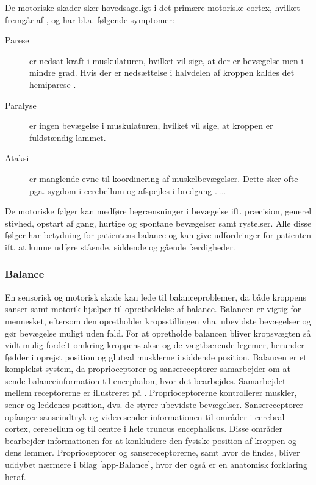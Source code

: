 
De motoriske skader sker hovedsageligt i det primære motoriske cortex, hvilket fremgår af , og har bl.a. følgende symptomer:
\begin{description}
  \item[Parese] er nedsat kraft i muskulaturen, hvilket vil sige, at der er bevægelse men i mindre grad. Hvis der er nedsættelse i halvdelen af kroppen kaldes det hemiparese \cite{Sundhed.dk2014a}.
  \item[Paralyse] er ingen bevægelse i muskulaturen, hvilket vil sige, at kroppen er fuldstændig lammet. \cite{Vistrup2015}
  \item[Ataksi] er manglende evne til koordinering af muskelbevægelser. Dette sker ofte pga. sygdom i cerebellum og afspejles i bredgang \cite{Redaktionen2015a}. 
  \ldots
\end{description}
De motoriske følger kan medføre begrænsninger i bevægelse ift. præcision, generel stivhed, opstart af gang, hurtige og spontane bevægelser samt rystelser. Alle disse følger har betydning for patientens balance og kan give udfordringer for patienten ift. at kunne udføre stående, siddende og gående færdigheder. \cite{Sundhed.dk,DSfA2009} 

\subsubsection{Balance}
En sensorisk og motorisk skade kan lede til balanceproblemer, da både kroppens sanser samt motorik hjælper til opretholdelse af balance. Balancen er vigtig for mennesket, eftersom den opretholder kropsstillingen vha. ubevidste bevægelser og gør bevægelse muligt uden fald. For at opretholde balancen bliver kropsvægten så vidt mulig fordelt omkring kroppens akse og de vægtbærende legemer, herunder fødder i oprejst position og gluteal musklerne i siddende position. \cite{Nichols1997}
Balancen er et komplekst system, da proprioceptorer og sansereceptorer samarbejder om at sende balanceinformation til encephalon, hvor det bearbejdes. Samarbejdet mellem receptorerne er illustreret på . Proprioceptorerne kontrollerer muskler, sener og leddenes position, dvs. de styrer ubevidste bevægelser. \cite{Martini2012} Sansereceptorer opfanger sanseindtryk og videresender informationen til områder i cerebral cortex, cerebellum og til centre i hele truncus encephalicus. Disse områder bearbejder informationen for at konkludere den fysiske position af kroppen og dens lemmer. \cite{Martini2012,Karnath2003} Proprioceptorer og sansereceptorerne, samt hvor de findes, bliver uddybet nærmere i bilag \ref{app-Balance}, hvor der også er en anatomisk forklaring heraf.

